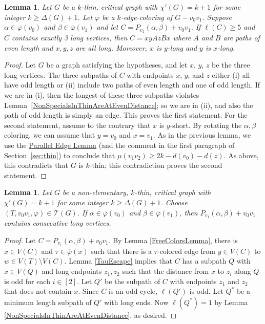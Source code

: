 \documentclass[12pt]{article}
\theoremstyle{plain}
\newtheorem{lem}[thm]{Lemma}
\theoremstyle{definition}
\theoremstyle{remark}
\newcommand{\fancy}[1]{\mathcal{#1}}
\newcommand{\T}{\fancy{T}}
\newcommand{\irange}[1]{\left[#1\right]}
\newcommand{\vph}{\varphi}
\newcommand{\vphn}{\overline{\varphi}}
\begin{document}
\begin{lem}\label{ThreeNonSpecialOnCycle}
Let $G$ be a $k$-thin, critical graph with $\chi'(G) = k+1$ for some integer $k
\ge \Delta(G) + 1$.  Let $\vph$ be a $k$-edge-coloring of $G-v_0v_1$. Suppose
$\alpha \in \vphn(v_0)$ and $\beta \in \vphn(v_1)$ and let $C = P_{v_1}(\alpha,
\beta) + v_0v_1$.  If $\ell(C)\ge 5$ and $C$ contains exactly 3 long vertices,
then $C = xyAzBx$ where $A$ and $B$ are paths of even length and $x,y,z$ are
all long.  Moreover, $x$ is $y$-long and $y$ is $x$-long.
\end{lem}
\begin{proof}
Let $G$ be a graph satisfying the hypotheses, and let $x$, $y$, $z$ be the
three long vertices.
The three subpaths of $C$ with endpoints $x$,
$y$, and $z$ either (i) all have odd length or (ii) include two paths of even
length and one of odd length.  
If we are in (i), then the longest of these three subpaths
violates Lemma~\ref{NonSpecialsInThinAreAtEvenDistance}; so we are in (ii), and
also the path of odd length is simply an edge.  This proves the first statement.
For the second statement, assume to the contrary that $x$ is $y$-short.
By rotating the $\alpha,\beta$ coloring, we can assume that $y=v_0$ and $x=v_1$.
As in the previous lemma, we use the \hyperref[SpecialPath]{Parallel Edge Lemma} (and the comment in the
first paragraph of Section~\ref{sec:thin}) to conclude that $\mu(v_1v_2)\ge
2k-d(v_0)-d(z)$.  As above, this contradicts that $G$ is $k$-thin; this
contradiction proves the second statement.
\end{proof}

\begin{lem}\label{ConsecutiveNonSpecials}
Let $G$ be a non-elementary, $k$-thin, critical graph with $\chi'(G) = k+1$ for
some integer $k \ge \Delta(G) + 1$.  Choose $(T, v_0v_1, \vph) \in \T(G)$. If
$\alpha \in \vphn(v_0)$ and $\beta \in \vphn(v_1)$, then $P_{v_1}(\alpha,
\beta) + v_0v_1$ contains consecutive long vertices.
\end{lem}
\begin{proof}
Let $C = P_{v_1}(\alpha, \beta) + v_0v_1$.  By Lemma \ref{FreeColorsLemma},
there is $x \in V(C)$ and $\tau \in \vphn(x)$ such that there is a
$\tau$-colored edge from $y \in V(C)$ to $w \in V(T) \setminus V(C)$.
Lemma \ref{TauEscape} implies that $C$ has a subpath $Q$ with $x \in V(Q)$
 and long endpoints $z_1,z_2$ such that the distance from $x$ to
$z_i$ along $Q$ is odd for each $i \in \irange{2}$.  
Let $Q'$ be the subpath of $C$ with endpoints $z_1$ and $z_2$ that does not contain
$x$. Since $C$ is an odd cycle, $\ell(Q')$ is odd.  Let $Q^*$ be a minimum
length subpath of $Q'$ with long ends.  Now $\ell(Q^*) = 1$ by Lemma
\ref{NonSpecialsInThinAreAtEvenDistance}, as desired.
\end{proof}
\end{document}
